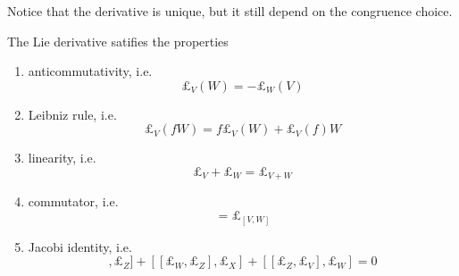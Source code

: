     Notice that the derivative is unique, but it still depend on the congruence choice. 

    The Lie derivative satifies the properties 
    \begin{enumerate}
        \item anticommutativity, i.e. 
            \begin{equation*}
                \pounds_V (W) = - \pounds_W (V) 
            \end{equation*}
        \item Leibniz rule, i.e. 
            \begin{equation}\label{leib}
                \pounds_V (fW) = f \pounds_V (W) + \pounds_V (f) W  
            \end{equation}
        \item linearity, i.e.
            \begin{equation*}
                \pounds_V + \pounds_W = \pounds_{V+W}
            \end{equation*}
        \item commutator, i.e.
            \begin{equation*}
                [\pounds_V, \pounds_W] = \pounds_{[V,W]}
            \end{equation*}
        \item Jacobi identity, i.e.
            \begin{equation*}
                [[\pounds_V, \pounds_W], \pounds_Z] + [[\pounds_W, \pounds_Z], \pounds_X] + [[\pounds_Z, \pounds_V], \pounds_W] = 0 
            \end{equation*}
    \end{enumerate}

